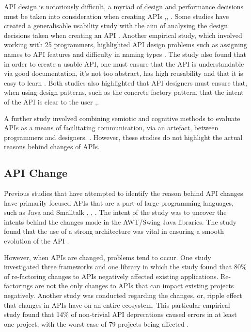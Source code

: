 \documentclass[10pt,twocolumn]{article}
\begin{document}
API design is notoriously difficult, a myriad of design and performance decisions must be taken into consideration when creating APIs \cite{bloch2008effective},\cite{afonso2012evaluating}, \cite{stylos2006comparing}. Some studies have created a generalisable usability study with the aim of analysing the design decisions taken when creating an API \cite{}. Another empirical study, which involved working with 25 programmers, highlighted API design problems such as assigning names to API features and difficulty in naming types \cite{shi2011empirical}. The study also found that in order to create a usable API, one must ensure that the API is understandable via good documentation, it’s not too abstract, has high reusability and that it is easy to learn \cite{shi2011empirical}. Both studies also highlighted that API designers must ensure that, when using design patterns, such as the concrete factory pattern, that the intent of the API is clear to the user \cite{shi2011empirical},\cite{stylos2006comparing}.

A further study involved combining semiotic and cognitive methods to evaluate APIs as a means of facilitating communication, via an artefact, between programmers and designers. \cite{afonso2012evaluating}. However, these studies do not highlight the actual reasons behind changes of APIs.

\subsection{API Change}
Previous studies that have attempted to identify the reason behind API changes have primarily focused APIs that are a part of large programming languages, such as Java and Smalltalk \cite{robbes2012developers}, \cite{shi2011empirical}, \cite{hou2011exploring}. The intent of the study was to uncover the intents behind the changes made in the AWT/Swing Java libraries. The study found that the use of a strong architecture was vital in ensuring a smooth evolution of the API \cite{hou2011exploring}.

However, when APIs are changed, problems tend to occur. One study investigated three frameworks and one library in which the study found that 80\% of re-factoring changes to APIs negatively affected existing applications. Re-factorings are not the only changes to APIs that can impact existing projects negatively. Another study was conducted regarding the changes, or, ripple effect that changes in APIs have on an entire ecosystem. This particular empirical study found that 14\% of non-trivial API deprecations caused errors in at least one project, with the worst case of 79 projects being affected \cite{robbes2012developers}.
\end{document}
